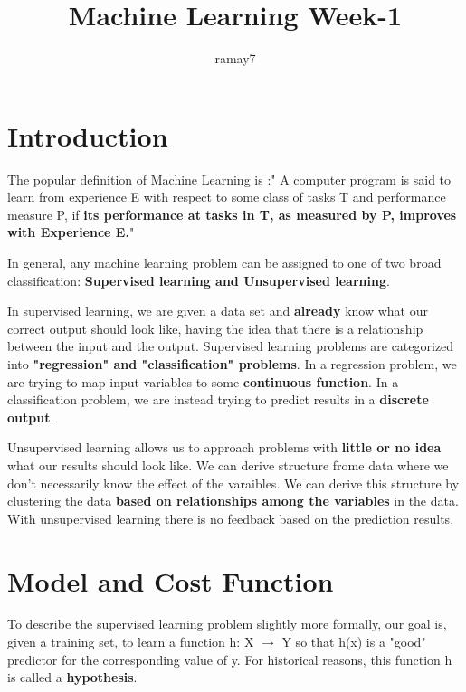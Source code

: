 \documentclass[11pt]{article}
\begin{document}
	\title{Machine Learning Week-1}
	\author{ramay7}
	
	\maketitle %
	\tableofcontents %
	
	\section{Introduction}
		
		The popular definition of Machine Learning is :" A computer program is said to learn from experience E with respect to some class of tasks T and performance measure P, if \textbf{its performance at tasks in T, as measured by P, improves with Experience E.}"

		In general, any machine learning problem can be assigned to one of two broad classification: \textbf{Supervised learning and Unsupervised learning}.

		In supervised learning, we are given a data set and \textbf{already} know what our correct output should look like, having the idea that there is a relationship between the input and the output. Supervised learning problems are categorized into \textbf{"regression" and "classification" problems}. In a regression problem, we are trying to map input variables to some \textbf{continuous function}. In a classification problem, we are instead trying to predict results in a \textbf{discrete output}.

		Unsupervised learning allows us to approach problems with \textbf{little or no idea} what our results should look like. We can derive structure frome data where we don't necessarily know the effect of the varaibles. We can derive this structure by clustering the data \textbf{based on relationships among the variables} in the data. With unsupervised learning there is no feedback based on the prediction results.

	\section{Model and Cost Function}

		To describe the supervised learning problem slightly more formally, our goal is, given a training set, to learn a function h: X $\rightarrow$ Y so that h(x) is a "good" predictor for the corresponding value of y. For historical reasons, this function h is called a \textbf{hypothesis}.
\end{document}

